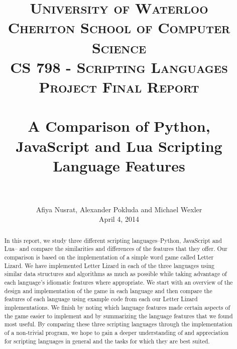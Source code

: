 \documentclass[letterpaper, 12pt, titlepage, final]{article}
\title{
		\usefont{OT1}{bch}{b}{n}
		\normalfont \normalsize \textsc{University of Waterloo\\Cheriton School of Computer Science\\CS 798 - Scripting Languages Project Final Report} \\ [25pt]
		\horrule{0.5pt} \\[0.4cm]
		\huge A Comparison of Python, JavaScript and Lua Scripting Language Features \\
		\horrule{2pt} \\[0.5cm]
}
\author{
		\normalfont \normalsize
        Afiya Nusrat, Alexander Pokluda and Michael Wexler\\[-3pt] \normalsize
        April 4, 2014
}
\date{}
\begin{document}
\maketitle

\thispagestyle{fancy}

\begin{abstract}

In this report, we study three different scripting languages--Python, JavaScript and Lua--
and compare the similarities and differences of the features that they offer.
Our comparison is based on the implementation of a simple word game called Letter Lizard.
We have implemented Letter Lizard in each of the three languages using similar
data structures and algorithms as much as possible while taking advantage of each
language's idiomatic features where appropriate. We start with an overview of the
design and implementation of the game in each language and then compare the
features of each language using example code from each our Letter Lizard implementations.
We finish by noting which language features made certain aspects of the game
easier to implement and by summarizing the language features that we found most
useful. By comparing these three scripting languages through the implementation
of a non-trivial program, we hope to gain a deeper understanding of and appreciation
for scripting languages in general and the tasks for which they are best suited.

\end{abstract}

\cleardoublepage

\renewcommand\contentsname{Table of Contents}
\tableofcontents
\cleardoublepage
{}

\listoffigures
\cleardoublepage
{}		%

\lstlistoflistings
\cleardoublepage
{}		%


\cleardoublepage

\setcounter{page}{1}
\end{document}
